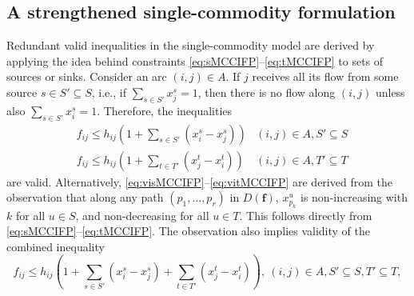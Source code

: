 \documentclass[pdflatex,sn-mathphys-num]{sn-jnl}%
\theoremstyle{thmstyleone}%
\begin{document}
\subsection{A strengthened single-commodity formulation} \label{sec:vis}
Redundant valid inequalities in the single-commodity model are derived by applying the idea behind constraints \eqref{eq:sMCCIFP}--\eqref{eq:tMCCIFP}
to sets of sources or sinks.
Consider an arc $(i,j) \in A$. If $j$ receives all its flow from some source $s\in S'\subseteq S$, i.e., if $\sum_{s\in S'}x_j^s=1$,
then there is no flow along $(i,j)$ unless also $\sum_{s\in S'}x_i^s=1$.
Therefore, the inequalities
\begin{eqnarray}
 & f_{ij}\leq h_{ij}\left(1+\sum_{s\in S'}(x_i^s-x_j^s)\right) & (i,j)\in A, S'\subseteq S \label{eq:visMCCIFP} \\
 & f_{ij}\leq h_{ij}\left(1+\sum_{t\in T'}(x_j^t-x_i^t)\right) & (i,j)\in A, T'\subseteq T \label{eq:vitMCCIFP}
\end{eqnarray}
are valid.
Alternatively, \eqref{eq:visMCCIFP}--\eqref{eq:vitMCCIFP} are derived from the observation that along any path $(p_1,\ldots,p_r)$ in $D(\boldsymbol{f})$,
$x_{p_k}^u$ is non-increasing with $k$ for all $u\in S$, and non-decreasing for all $u\in T$.
This follows directly from \eqref{eq:sMCCIFP}--\eqref{eq:tMCCIFP}.
The observation also implies validity of the combined inequality
\begin{equation}
	\displaystyle{f_{ij}\leq h_{ij}\left(1+\sum_{s\in S'}(x_i^s-x_j^s) + \sum_{t\in T'}(x_j^t-x_i^t)\right)}, ~(i,j)\in A, S'\subseteq S, T'\subseteq T, \label{eq:vistMCCIFP}
\end{equation}
\end{document}
